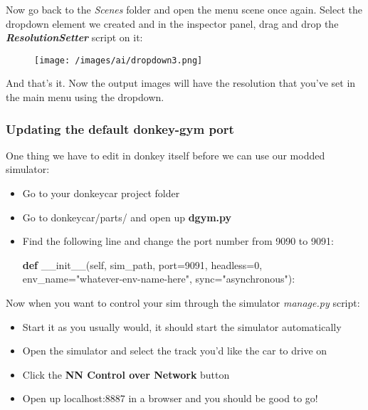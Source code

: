 \documentclass[
]{article}
\newenvironment{Shaded}{}{}
\newcommand{\DecValTok}[1]{\textcolor[rgb]{0.25,0.63,0.44}{#1}}
\newcommand{\FunctionTok}[1]{\textcolor[rgb]{0.02,0.16,0.49}{#1}}
\newcommand{\KeywordTok}[1]{\textcolor[rgb]{0.00,0.44,0.13}{\textbf{#1}}}
\newcommand{\NormalTok}[1]{#1}
\newcommand{\OperatorTok}[1]{\textcolor[rgb]{0.40,0.40,0.40}{#1}}
\newcommand{\StringTok}[1]{\textcolor[rgb]{0.25,0.44,0.63}{#1}}
\newcommand{\VariableTok}[1]{\textcolor[rgb]{0.10,0.09,0.49}{#1}}
\begin{document}
Now go back to the \emph{Scenes} folder and open the menu scene once
again. Select the dropdown element we created and in the inspector
panel, drag and drop the \textbf{\emph{ResolutionSetter}} script on it:

\begin{figure}
\centering
\texttt{[image: /images/ai/dropdown3.png]}
\caption{}
\end{figure}

And that's it. Now the output images will have the resolution that
you've set in the main menu using the dropdown.

\hypertarget{header-n43}{%
\subsubsection{Updating the default donkey-gym port}\label{header-n43}}

One thing we have to edit in donkey itself before we can use our modded
simulator:

\begin{itemize}
\item
  Go to your donkeycar project folder
\item
  Go to donkeycar/parts/ and open up \textbf{dgym.py}
\item
  Find the following line and change the port number from 9090 to 9091:

\begin{Shaded}
\begin{Highlighting}[]
\KeywordTok{def} \FunctionTok{\_\_init\_\_}\NormalTok{(}\VariableTok{self}\NormalTok{, sim\_path, port}\OperatorTok{=}\DecValTok{9091}\NormalTok{, headless}\OperatorTok{=}\DecValTok{0}\NormalTok{, env\_name}\OperatorTok{=}\StringTok{"whatever{-}env{-}name{-}here"}\NormalTok{, sync}\OperatorTok{=}\StringTok{"asynchronous"}\NormalTok{):}
\end{Highlighting}
\end{Shaded}
\end{itemize}

Now when you want to control your sim through the simulator
\emph{manage.py} script:

\begin{itemize}
\item
  Start it as you usually would, it should start the simulator
  automatically
\item
  Open the simulator and select the track you'd like the car to drive on
\item
  Click the \textbf{NN Control over Network} button
\item
  Open up localhost:8887 in a browser and you should be good to go!
\end{itemize}
\end{document}
